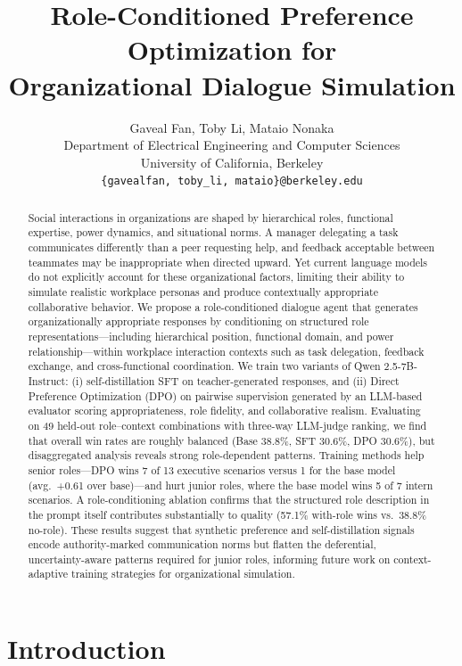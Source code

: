 \documentclass{article}
\title{Role-Conditioned Preference Optimization for\\Organizational Dialogue Simulation}
\author{Gaveal Fan, Toby Li, Mataio Nonaka \\
Department of Electrical Engineering and Computer Sciences\\
University of California, Berkeley\\
\texttt{\{gavealfan, toby\_li, mataio\}@berkeley.edu}}
\begin{document}
\maketitle

\begin{abstract}
Social interactions in organizations are shaped by hierarchical roles, functional expertise, power dynamics, and situational norms. A manager delegating a task communicates differently than a peer requesting help, and feedback acceptable between teammates may be inappropriate when directed upward. Yet current language models do not explicitly account for these organizational factors, limiting their ability to simulate realistic workplace personas and produce contextually appropriate collaborative behavior. We propose a role-conditioned dialogue agent that generates organizationally appropriate responses by conditioning on structured role representations---including hierarchical position, functional domain, and power relationship---within workplace interaction contexts such as task delegation, feedback exchange, and cross-functional coordination. We train two variants of Qwen 2.5-7B-Instruct: (i) self-distillation SFT on teacher-generated responses, and (ii) Direct Preference Optimization (DPO) on pairwise supervision generated by an LLM-based evaluator scoring appropriateness, role fidelity, and collaborative realism. Evaluating on 49 held-out role--context combinations with three-way LLM-judge ranking, we find that overall win rates are roughly balanced (Base 38.8\%, SFT 30.6\%, DPO 30.6\%), but disaggregated analysis reveals strong role-dependent patterns. Training methods help senior roles---DPO wins 7 of 13 executive scenarios versus 1 for the base model (avg.\ +0.61 over base)---and hurt junior roles, where the base model wins 5 of 7 intern scenarios. A role-conditioning ablation confirms that the structured role description in the prompt itself contributes substantially to quality (57.1\% with-role wins vs.\ 38.8\% no-role). These results suggest that synthetic preference and self-distillation signals encode authority-marked communication norms but flatten the deferential, uncertainty-aware patterns required for junior roles, informing future work on context-adaptive training strategies for organizational simulation.
\end{abstract}

\section{Introduction}
\end{document}
